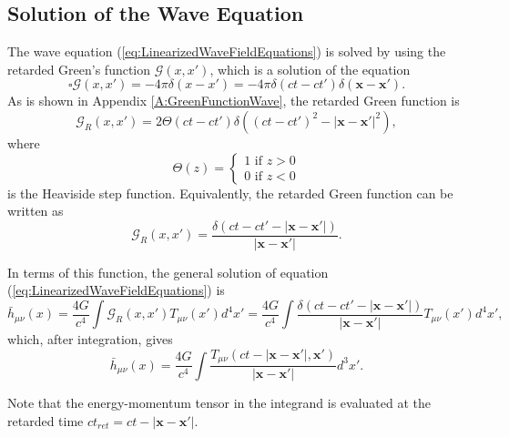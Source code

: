 \subsection{Solution of the Wave Equation}
The wave equation (\ref{eq:LinearizedWaveFieldEquations}) is solved by using the retarded Green's function $\mathcal{G} (x,x')$, which is a solution of the equation
\begin{equation}
\square \mathcal{G} (x,x') = - 4\pi \delta (x-x') = -4\pi \delta (ct-ct') \delta (\textbf{x} - \textbf{x}').
\end{equation}
As is shown in Appendix \ref{A:GreenFunctionWave}, the retarded Green function is
\begin{equation}
\mathcal{G}_R (x,x') = 2 \Theta \left( ct - ct' \right) \delta \left( ( ct - ct' )^2 - \left| \textbf{x} - \textbf{x}' \right| ^2 \right) ,
\end{equation}
where 
\begin{equation}
\Theta(z) = 
\begin{cases} 
1 \text{ if } z>0 \\
0 \text{ if } z<0
\end{cases}
\end{equation}
is the Heaviside step function. Equivalently, the retarded Green function can be written as
\begin{equation}
\mathcal{G}_R (x,x') = \frac{\delta \left( ct - ct' - \left| \textbf{x} - \textbf{x}' \right| \right)}{\left| \textbf{x} - \textbf{x}' \right| } .
\end{equation}

In terms of this function, the general solution of equation (\ref{eq:LinearizedWaveFieldEquations}) is
\begin{equation}
\bar{h}_{\mu \nu} (x) = \frac{4G}{c^4} \int \mathcal{G}_R (x,x') T_{\mu \nu} (x') d^4 x' = \frac{4G}{c^4} \int \frac{\delta \left( ct - ct' - \left| \textbf{x} - \textbf{x}' \right| \right)}{\left| \textbf{x} - \textbf{x}' \right| } T_{\mu \nu} (x') d^4 x' ,
\end{equation}
which, after integration, gives
\begin{equation}
\bar{h}_{\mu \nu} (x) = \frac{4G}{c^4} \int \frac{T_{\mu \nu} \left( ct  - \left| \textbf{x} - \textbf{x}' \right| , \textbf{x}' \right)}{\left| \textbf{x} - \textbf{x}' \right| }  d^3 x' . \label{eq:WavEquationSolution}
\end{equation}

Note that the energy-momentum tensor in the integrand is evaluated at the retarded time $ct_{ret} = ct  - \left| \textbf{x} - \textbf{x}' \right|$.

